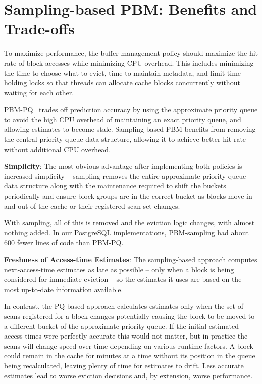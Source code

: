 \section{Sampling-based PBM: Benefits and Trade-offs\label{sec:sampling-advantages}}

To maximize performance, the buffer management policy should maximize the hit rate of block accesses while minimizing CPU overhead. This includes minimizing the time to choose what to evict, time to maintain metadata, and limit time holding locks so that threads can allocate cache blocks concurrently without waiting for each other.

PBM-PQ~\cite{pbm} trades off prediction accuracy by using the approximate priority queue to avoid the high CPU overhead of maintaining an exact priority queue, and allowing estimates to become stale. Sampling-based PBM benefits from removing the central priority-queue data structure, allowing it to achieve better hit rate without additional CPU overhead.


\textbf{Simplicity}: The most obvious advantage after implementing both policies is increased simplicity -- sampling removes the entire approximate priority queue data structure along with the maintenance required to shift the buckets periodically and ensure block groups are in the correct bucket as blocks move in and out of the cache or their registered scan set changes.

With sampling, all of this is removed and the eviction logic changes, with almost nothing added. In our PostgreSQL implementations, PBM-sampling had about 600 fewer lines of code than PBM-PQ.


\textbf{Freshness of Access-time Estimates}: The sampling-based approach computes next-access-time estimates as late as possible -- only when a block is being considered for immediate eviction -- so the estimates it uses are based on the most up-to-date information available.

In contrast, the PQ-based approach calculates estimates only when the set of scans registered for a block changes potentially causing the block to be moved to a different bucket of the approximate priority queue. If the initial estimated access times were perfectly accurate this would not matter, but in practice the scans will change speed over time depending on various runtime factors. A block could remain in the cache for minutes at a time without its position in the queue being recalculated, leaving plenty of time for estimates to drift. Less accurate estimates lead to worse eviction decisions and, by extension, worse performance.

